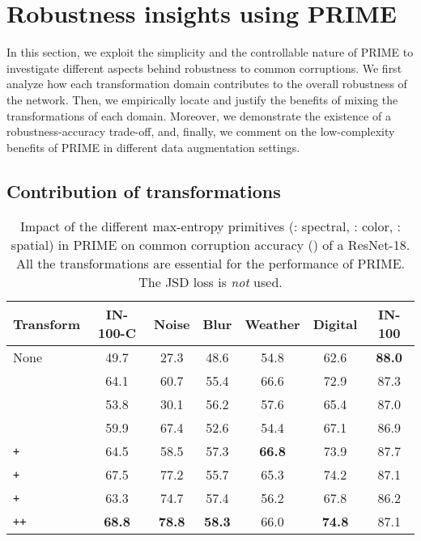 \documentclass[runningheads]{llncs}
\begin{document}
\section{Robustness insights using PRIME}
\label{sec:analysis}


In this section, we exploit the simplicity and the controllable nature of PRIME to investigate different aspects behind robustness to common corruptions. We first analyze how each transformation domain contributes to the overall robustness of the network. Then, we empirically locate and justify the benefits of mixing the transformations of each domain. Moreover, we demonstrate the existence of a robustness-accuracy trade-off, and, finally, we comment on the low-complexity benefits of PRIME in different data augmentation settings.

\subsection{Contribution of transformations}
\label{sec:orthogonality}

\begin{table}[t]
    \centering
    \footnotesize
    \caption{Impact of the different max-entropy primitives (: spectral, : color, : spatial) in PRIME on common corruption accuracy () of a ResNet-18. All the transformations are essential for the performance of PRIME. The JSD loss is \emph{not} used.}
    \begin{tabular}{lcccccc}
        \toprule
        {Transform} & {IN-100-C} & {Noise} & {Blur} & {Weather} & {Digital} & {IN-100}\\
        \midrule
        None & 49.7 & 27.3 & 48.6 & 54.8 & 62.6 & \textbf{88.0}\\
         & 64.1 & 60.7 & 55.4 & 66.6 & 72.9 & 87.3\\
         & 53.8 & 30.1 & 56.2 & 57.6 & 65.4 & 87.0\\
         & 59.9 & 67.4 & 52.6 & 54.4 & 67.1 & 86.9\\
        \texttt{+} & 64.5 & 58.5 & 57.3 & \textbf{66.8} & 73.9 & 87.7\\
        \texttt{+} & 67.5 & 77.2 & 55.7 & 65.3 & 74.2 & 87.1\\
        \texttt{+} & 63.3 & 74.7 & 57.4 & 56.2 & 67.8 & 86.2\\
        \texttt{+}\texttt{+} & \textbf{68.8} & \textbf{78.8} & \textbf{58.3} & 66.0 & \textbf{74.8} & 87.1\\
        \bottomrule
    \end{tabular}
    \vspace*{-2mm}
    \label{tab:orthogonality-in100}
\end{table}
\end{document}

